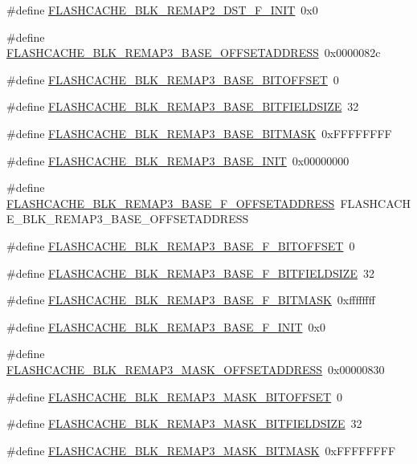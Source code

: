\begin{DoxyCompactItemize}
\item 
\#define \hyperlink{a00550_add36a61299e97f0492e7382a9060d46e}{FLASHCACHE\_\-BLK\_\-REMAP2\_\-DST\_\-F\_\-INIT}~0x0
\item 
\#define \hyperlink{a00550_a0fc2890b7862e761e6a69b36a0f543c4}{FLASHCACHE\_\-BLK\_\-REMAP3\_\-BASE\_\-OFFSETADDRESS}~0x0000082c
\item 
\#define \hyperlink{a00550_a02b46c3b02e569077d858539e7bb90ba}{FLASHCACHE\_\-BLK\_\-REMAP3\_\-BASE\_\-BITOFFSET}~0
\item 
\#define \hyperlink{a00550_a1293af7752ddd04c3666f067bcd0fd01}{FLASHCACHE\_\-BLK\_\-REMAP3\_\-BASE\_\-BITFIELDSIZE}~32
\item 
\#define \hyperlink{a00550_ad3353c7bb3f79f85bd4d4095d82ad732}{FLASHCACHE\_\-BLK\_\-REMAP3\_\-BASE\_\-BITMASK}~0xFFFFFFFF
\item 
\#define \hyperlink{a00550_a2a245eb2727e3c45b84714caaa561153}{FLASHCACHE\_\-BLK\_\-REMAP3\_\-BASE\_\-INIT}~0x00000000
\item 
\#define \hyperlink{a00550_a80b6960f9369fc7b70221b9c546e57f6}{FLASHCACHE\_\-BLK\_\-REMAP3\_\-BASE\_\-F\_\-OFFSETADDRESS}~FLASHCACHE\_\-BLK\_\-REMAP3\_\-BASE\_\-OFFSETADDRESS
\item 
\#define \hyperlink{a00550_adc884c8aedfc91514168490bb1474250}{FLASHCACHE\_\-BLK\_\-REMAP3\_\-BASE\_\-F\_\-BITOFFSET}~0
\item 
\#define \hyperlink{a00550_a4c3cceaa9be2113ec25770701e3ea28c}{FLASHCACHE\_\-BLK\_\-REMAP3\_\-BASE\_\-F\_\-BITFIELDSIZE}~32
\item 
\#define \hyperlink{a00550_ab9984cdf3064b81a7d96968d33b91ad1}{FLASHCACHE\_\-BLK\_\-REMAP3\_\-BASE\_\-F\_\-BITMASK}~0xffffffff
\item 
\#define \hyperlink{a00550_a310168ad6c650d87881312a1c8d06fa7}{FLASHCACHE\_\-BLK\_\-REMAP3\_\-BASE\_\-F\_\-INIT}~0x0
\item 
\#define \hyperlink{a00550_a667857a2dcdb8a2f065ef868918c0920}{FLASHCACHE\_\-BLK\_\-REMAP3\_\-MASK\_\-OFFSETADDRESS}~0x00000830
\item 
\#define \hyperlink{a00550_af1077443884978bab2dac7cbed71babc}{FLASHCACHE\_\-BLK\_\-REMAP3\_\-MASK\_\-BITOFFSET}~0
\item 
\#define \hyperlink{a00550_a45928cfe55f2dc7a789c49da24af6b34}{FLASHCACHE\_\-BLK\_\-REMAP3\_\-MASK\_\-BITFIELDSIZE}~32
\item 
\#define \hyperlink{a00550_ad735ec486c619dc29da91f706e9eaff1}{FLASHCACHE\_\-BLK\_\-REMAP3\_\-MASK\_\-BITMASK}~0xFFFFFFFF
\item 

\end{DoxyCompactItemize}
